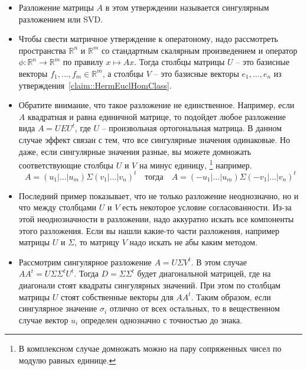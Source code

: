 \begin{itemize}
\item Разложение матрицы $A$ в этом утверждении называется сингулярным разложением или SVD.

\item
Чтобы свести матричное утверждение к оператоному, надо рассмотреть пространства $\mathbb R^n$ и $\mathbb R^m$ со стандартным скалярным произведением и оператор $\phi\colon \mathbb R^n \to \mathbb R^m$ по правилу $x\mapsto Ax$.
Тогда столбцы матрицы $U$ -- это базисные векторы $f_1,\ldots,f_m\in \mathbb R^m$, а столбцы $V$ -- это базисные векторы $e_1,\ldots,e_n$ из утверждения~\ref{claim::HermEuclHomClass}.

\item
Обратите внимание, что такое разложение не единственное.
Например, если $A$ квадратная и равна единичной матрице, то подойдет любое разложение вида $A = U E U^t$, где $U$ -- произвольная ортогональная матрица.
В данном случае эффект связан с тем, что все сингулярные значения одинаковые.
Но даже, если сингулярные значения разные, вы можете домножать соответствующие столбцы $U$ и $V$ на минус единицу,%
\footnote{В комплексном случае домножать можно на пару сопряженных чисел по модулю равных единице.}
например.
\[
A = (u_1|\ldots | u_m)\Sigma (v_1|\ldots|v_n)^t
\quad\text{тогда}\quad
A = (-u_1|\ldots | u_m)\Sigma (-v_1|\ldots|v_n)^t
\]

\item
Последний пример показывает, что не только разложение неоднозначно, но и что между столбцами $U$ и $V$ есть некоторое условие согласованности.
Из-за этой неоднозначности в разложении, надо аккуратно искать все компоненты этого разложения.
Если вы нашли какие-то части разложения, например матрицы $U$ и $\Sigma$, то матрицу $V$ надо искать не абы каким методом.

\item
Рассмотрим сингулярное разложение $A = U \Sigma V^t$.
В этом случае $AA^t = U \Sigma\Sigma^t U^t$.
Тогда $D= \Sigma\Sigma^t$ будет диагональной матрицей, где на диагонали стоят квадраты сингулярных значений.
При этом по столбцам матрицы $U$ стоят собственные векторы для $AA^t$.
Таким образом, если сингулярное значение $\sigma_i$ отлично от всех остальных, то в вещественном случае вектор $u_i$ определен однозначно с точностью до знака.
\end{itemize}

